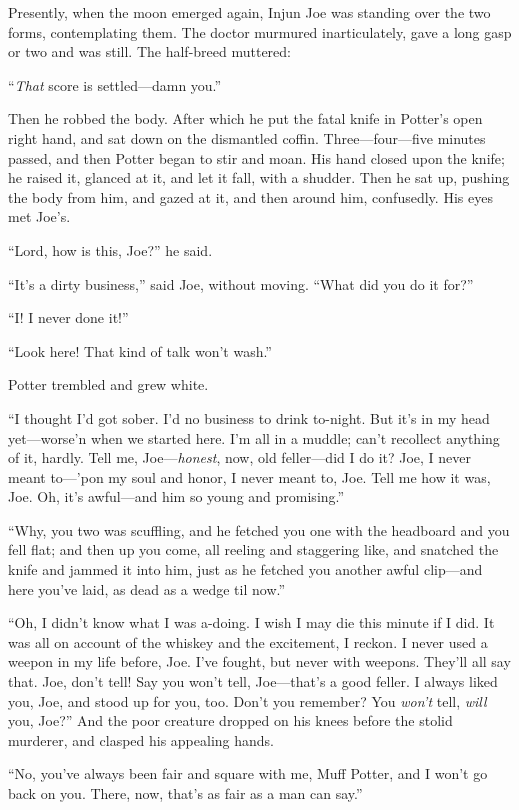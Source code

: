 \documentclass{book}
\begin{document}
Presently, when the moon emerged again, Injun Joe was standing over the two forms, contemplating them. The doctor murmured inarticulately, gave a long gasp or two and was still. The half-breed muttered:

“\emph{That} score is settled—damn you.”

Then he robbed the body. After which he put the fatal knife in Potter’s open right hand, and sat down on the dismantled coffin. Three—four—five minutes passed, and then Potter began to stir and moan. His hand closed upon the knife; he raised it, glanced at it, and let it fall, with a shudder. Then he sat up, pushing the body from him, and gazed at it, and then around him, confusedly. His eyes met Joe’s.

“Lord, how is this, Joe?” he said.

“It’s a dirty business,” said Joe, without moving. “What did you do it for?”

“I! I never done it!”

“Look here! That kind of talk won’t wash.”

Potter trembled and grew white.

“I thought I’d got sober. I’d no business to drink to-night. But it’s in my head yet—worse’n when we started here. I’m all in a muddle; can’t recollect anything of it, hardly. Tell me, Joe—\emph{honest}, now, old feller—did I do it? Joe, I never meant to—’pon my soul and honor, I never meant to, Joe. Tell me how it was, Joe. Oh, it’s awful—and him so young and promising.”

“Why, you two was scuffling, and he fetched you one with the headboard and you fell flat; and then up you come, all reeling and staggering like, and snatched the knife and jammed it into him, just as he fetched you another awful clip—and here you’ve laid, as dead as a wedge til now.”

“Oh, I didn’t know what I was a-doing. I wish I may die this minute if I did. It was all on account of the whiskey and the excitement, I reckon. I never used a weepon in my life before, Joe. I’ve fought, but never with weepons. They’ll all say that. Joe, don’t tell! Say you won’t tell, Joe—that’s a good feller. I always liked you, Joe, and stood up for you, too. Don’t you remember? You \emph{won’t} tell, \emph{will} you, Joe?” And the poor creature dropped on his knees before the stolid murderer, and clasped his appealing hands.

“No, you’ve always been fair and square with me, Muff Potter, and I won’t go back on you. There, now, that’s as fair as a man can say.”
\end{document}
